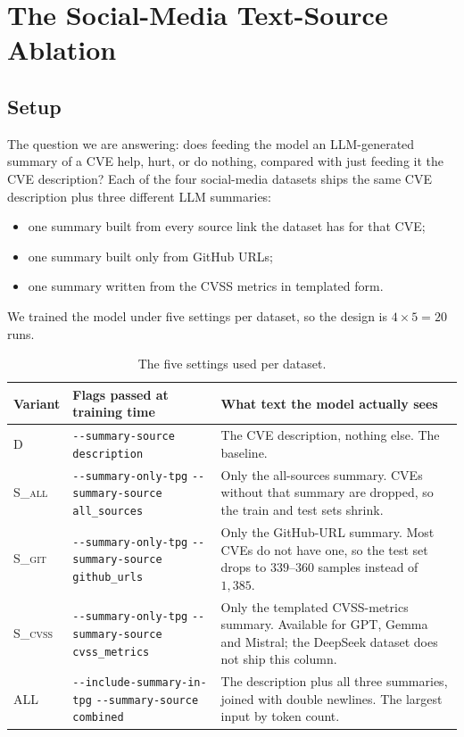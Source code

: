 \documentclass[11pt]{article}
\begin{document}
\section{The Social-Media Text-Source Ablation}

\subsection{Setup}

The question we are answering: does feeding the model an LLM-generated
summary of a CVE help, hurt, or do nothing, compared with just feeding
it the CVE description? Each of the four social-media datasets ships
the same CVE description plus three different LLM summaries:

\begin{itemize}
    \item one summary built from every source link the dataset has for
    that CVE;
    \item one summary built only from GitHub URLs;
    \item one summary written from the CVSS metrics in templated form.
\end{itemize}

We trained the model under five settings per dataset, so the design is
$4 \times 5 = 20$ runs.

\begin{table}[h]
\centering
\footnotesize
\begin{tabularx}{\textwidth}{@{}l Y Y@{}}
\toprule
Variant & Flags passed at training time & What text the model actually sees \\
\midrule
\textsc{D}      & \texttt{-{}-summary-source description} & The CVE description, nothing else. The baseline. \\[2pt]
\textsc{S\_all} & \texttt{-{}-summary-only-tpg} \newline \texttt{-{}-summary-source all\_sources}  & Only the all-sources summary. CVEs without that summary are dropped, so the train and test sets shrink. \\[2pt]
\textsc{S\_git} & \texttt{-{}-summary-only-tpg} \newline \texttt{-{}-summary-source github\_urls}  & Only the GitHub-URL summary. Most CVEs do not have one, so the test set drops to $339$--$360$ samples instead of $1{,}385$. \\[2pt]
\textsc{S\_cvss}& \texttt{-{}-summary-only-tpg} \newline \texttt{-{}-summary-source cvss\_metrics} & Only the templated CVSS-metrics summary. Available for GPT, Gemma and Mistral; the DeepSeek dataset does not ship this column. \\[2pt]
\textsc{ALL}    & \texttt{-{}-include-summary-in-tpg} \newline \texttt{-{}-summary-source combined} & The description plus all three summaries, joined with double newlines. The largest input by token count. \\
\bottomrule
\end{tabularx}
\caption{The five settings used per dataset.}
\end{table}
\end{document}
